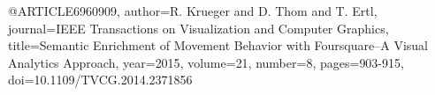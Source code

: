 @ARTICLE{6960909,
  author={R. {Krueger} and D. {Thom} and T. {Ertl}},
  journal={IEEE Transactions on Visualization and Computer Graphics}, 
  title={Semantic Enrichment of Movement Behavior with Foursquare–A Visual Analytics Approach}, 
  year={2015},
  volume={21},
  number={8},
  pages={903-915},
  doi={10.1109/TVCG.2014.2371856}}